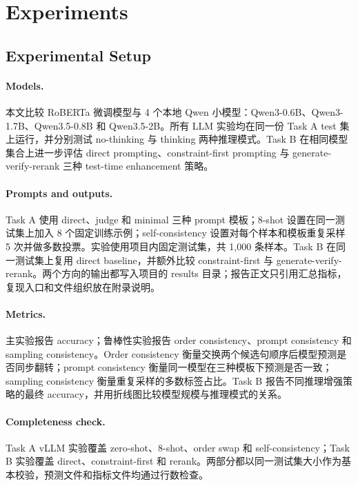 \section{Experiments}

\subsection{Experimental Setup}

\paragraph{Models.}
本文比较 RoBERTa 微调模型与 4 个本地 Qwen 小模型：Qwen3-0.6B、Qwen3-1.7B、Qwen3.5-0.8B 和 Qwen3.5-2B。所有 LLM 实验均在同一份 \comve Task A test 集上运行，并分别测试 no-thinking 与 thinking 两种推理模式。Task B 在相同模型集合上进一步评估 direct prompting、constraint-first prompting 与 generate-verify-rerank 三种 test-time enhancement 策略。

\paragraph{Prompts and outputs.}
Task A 使用 direct、judge 和 minimal 三种 prompt 模板；8-shot 设置在同一测试集上加入 8 个固定训练示例；self-consistency 设置对每个样本和模板重复采样 5 次并做多数投票。实验使用项目内固定测试集，共 1,000 条样本。Task B 在同一测试集上复用 direct baseline，并额外比较 constraint-first 与 generate-verify-rerank。两个方向的输出都写入项目的 results 目录；报告正文只引用汇总指标，复现入口和文件组织放在附录说明。

\paragraph{Metrics.}
主实验报告 accuracy；鲁棒性实验报告 order consistency、prompt consistency 和 sampling consistency。Order consistency 衡量交换两个候选句顺序后模型预测是否同步翻转；prompt consistency 衡量同一模型在三种模板下预测是否一致；sampling consistency 衡量重复采样的多数标签占比。Task B 报告不同推理增强策略的最终 accuracy，并用折线图比较模型规模与推理模式的关系。

\paragraph{Completeness check.}
Task A vLLM 实验覆盖 zero-shot、8-shot、order swap 和 self-consistency；Task B 实验覆盖 direct、constraint-first 和 rerank。两部分都以同一测试集大小作为基本校验，预测文件和指标文件均通过行数检查。

